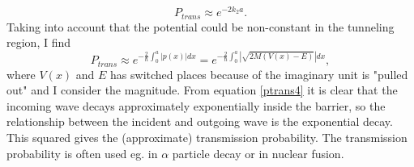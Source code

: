 \begin{example}
	\begin{equation}
		P_{trans}\approx e^{-2k_2a}.
		\label{ptrans3}
	\end{equation} 
	Taking into account that the potential could be non-constant in the tunneling region, I find
	\begin{equation}
		P_{trans}\approx e^{-\frac{2}{\hbar}\int_{0}^{a}|p(x)|dx}=e^{-\frac{2}{\hbar}\int_{0}^{a}|\sqrt{2M(V(x)-E)}|dx},
		\label{ptrans4}
	\end{equation} 
	where $V(x)$ and $E$ has switched places because of the imaginary unit is "pulled out" and I consider the magnitude. From equation \eqref{ptrans4} it is clear that the incoming wave decays approximately exponentially inside the barrier, so the relationship between the incident and outgoing wave is the exponential decay. This squared gives the (approximate) transmission probability. The transmission probability is often used eg. in $\alpha$ particle decay or in nuclear fusion.
\end{example}
